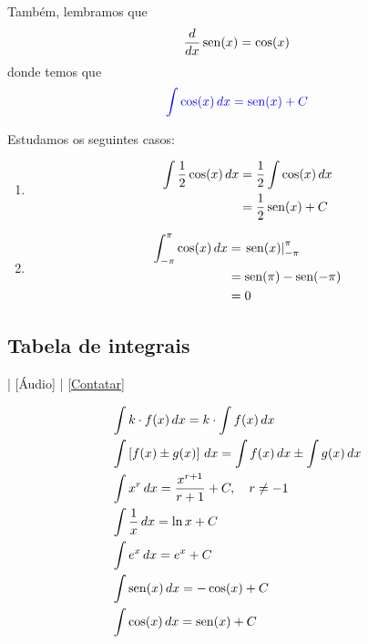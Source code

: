 Também, lembramos que
\begin{equation}
  \frac{d}{dx}\operatorname{sen}(x) = \cos(x)
\end{equation}
donde temos que
\begin{equation}
  {\color{blue}\int \cos(x)\,dx = \operatorname{sen}(x) + C}
\end{equation}

\begin{ex}
  Estudamos os seguintes casos:
  \begin{enumerate}
  \item
    \begin{align}
      \int \frac{1}{2}\cos(x)\,dx &= \frac{1}{2}\int\cos(x)\,dx\\
                                  &= \frac{1}{2}\operatorname{sen}(x) + C\\
    \end{align}
  \item
    \begin{align}
      \int_{-\pi}^\pi\cos(x)\,dx &= \left.\operatorname{sen}(x)\right|_{-\pi}^\pi\\
                                 &= \operatorname{sen}(\pi) - \operatorname{sen}(-\pi)\\
                                 &= 0
    \end{align}
  \end{enumerate}
\end{ex}

\subsection{Tabela de integrais}

\begin{flushright}
  [Vídeo] | [Áudio] | \href{https://phkonzen.github.io/notas/contato.html}{[Contatar]}
\end{flushright}

\begin{small}
\begin{align}
  & \int k\cdot f(x)\,dx = k\cdot\int f(x)\,dx\\
  & \int \left[f(x)\pm g(x)\right]\,dx = \int f(x)\,dx \pm \int g(x)\,dx\\
  & \int x^r\,dx = \frac{x^{r+1}}{r+1} + C,\quad r\neq -1\\
  & \int \frac{1}{x}\,dx = \ln x + C \\
  & \int e^x\,dx = e^x + C \\
  & \int \operatorname{sen}(x)\,dx = -\cos(x) + C \\
  & \int \cos(x)\,dx = \operatorname{sen}(x) + C
\end{align}
\end{small}

